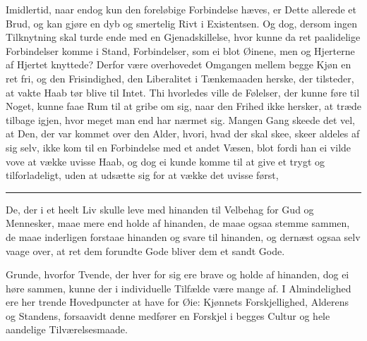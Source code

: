 \documentclass[12pt,a4paper]{book}
\newcommand{\apage}[1]{\marginnote{\footnotesize\textit{[#1]}}}
\begin{document}
Imidlertid, naar endog kun den foreløbige Forbindelse hæves, er Dette
allerede et Brud, og kan gjøre en dyb og smertelig Rivt i Existentsen.
Og dog, dersom ingen Tilknytning skal turde ende med en Gjenadskillelse,
hvor kunne da ret paalidelige Forbindelser komme i Stand, Forbindelser,
som ei blot Øinene, men og Hjerterne af Hjertet knyttede? Derfor være
overhovedet Omgangen mellem begge Kjøn en ret fri, og den Frisindighed,
den Liberalitet i Tænkemaaden herske, der tilsteder, at vakte Haab tør
blive til Intet. Thi hvorledes ville de Følelser, der kunne føre til
Noget, kunne faae Rum til at gribe om sig, naar den Frihed ikke hersker,
at træde tilbage igjen, hvor meget man end har nærmet sig. Mangen Gang
skeede det vel, at Den, der var kommet over den Alder, hvori, hvad der
skal skee, skeer aldeles af sig selv, ikke kom til en Forbindelse med et
andet Væsen, blot fordi han ei vilde vove at vække uvisse Haab, og dog
ei kunde komme til at give et trygt og tilforladeligt, uden at udsætte
sig for at vække det uvisse først,

\begin{center}\rule{0.28\linewidth}{0.4pt}\end{center} \apage{87}

De, der i et heelt Liv skulle leve med hinanden til Velbehag for Gud og
Mennesker, maae mere end holde af hinanden, de maae ogsaa stemme sammen,
de maae inderligen forstaae hinanden og svare til hinanden, og dernæst
ogsaa selv vaage over, at ret dem forundte Gode bliver dem et sandt
Gode.

Grunde, hvorfor Tvende, der hver for sig ere brave og holde af hinanden,
dog ei høre sammen, kunne der i individuelle Tilfælde være mange af. I
Almindelighed ere her trende Hovedpuncter at have for Øie: Kjønnets
Forskjellighed, Alderens og Standens, forsaavidt denne medfører en
Forskjel i begges Cultur og hele aandelige Tilværelsesmaade.
\end{document}
